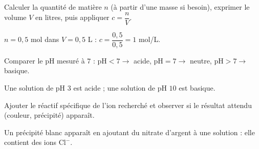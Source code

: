 Calculer la quantité de matière $n$ (à partir d'une masse si besoin), exprimer le volume
$V$ en litres, puis appliquer $c=\dfrac nV$.
\begin{exemple}
$n=0{,}5$ mol dans $V=0{,}5$ L : $c=\dfrac{0{,}5}{0{,}5}=1$ mol/L.
\end{exemple}

Comparer le pH mesuré à $7$ : $\text{pH}<7\to$ acide, $\text{pH}=7\to$ neutre,
$\text{pH}>7\to$ basique.
\begin{exemple}
Une solution de pH $3$ est acide ; une solution de pH $10$ est basique.
\end{exemple}

Ajouter le réactif spécifique de l'ion recherché et observer si le résultat attendu (couleur,
précipité) apparaît.
\begin{exemple}
Un précipité blanc apparaît en ajoutant du nitrate d'argent à une solution : elle contient
des ions $\mathrm{Cl^-}$.
\end{exemple}

